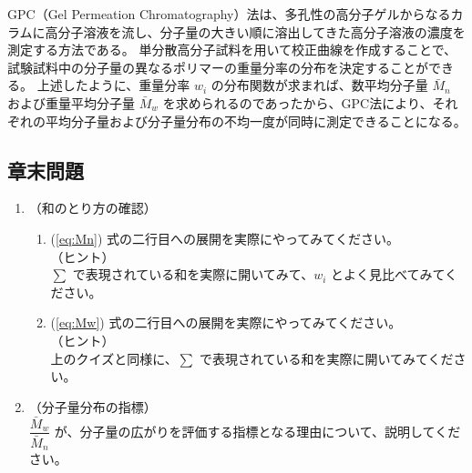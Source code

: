 \documentclass[a4paper,11pt]{ltjsarticle}
\begin{document}
GPC（Gel Permeation Chromatography）法は、多孔性の高分子ゲルからなるカラムに高分子溶液を流し、分子量の大きい順に溶出してきた高分子溶液の濃度を測定する方法である。
単分散高分子試料を用いて校正曲線を作成することで、試験試料中の分子量の異なるポリマーの重量分率の分布を決定することができる。
上述したように、重量分率 $w_i$ の分布関数が求まれば、数平均分子量 $\bar{M}_n$ および重量平均分子量 $\bar{M}_w$ を求められるのであったから、GPC法により、それぞれの平均分子量および分子量分布の不均一度が同時に測定できることになる。



\subsection{章末問題}

	\begin{enumerate}
	\item
	（和のとり方の確認）\\
		\vspace{-5mm}
		\begin{enumerate}
		\item
		\label{it:4-1}
		(\ref{eq:Mn}) 式の二行目への展開を実際にやってみてください。\\
		（ヒント）\\
		$\sum$ で表現されている和を実際に開いてみて、$w_i$ とよく見比べてみてください。

		\item
		\label{it:4-2}
		(\ref{eq:Mw}) 式の二行目への展開を実際にやってみてください。\\
		（ヒント）\\
		上のクイズと同様に、$\sum$ で表現されている和を実際に開いてみてください。
		\end{enumerate}
	\item
	（分子量分布の指標）\\
	\label{it:4-3}
	$\dfrac{\bar{M}_w}{\bar{M}_n}$ が、分子量の広がりを評価する指標となる理由について、説明してください。

	\end{enumerate}
\end{document}
